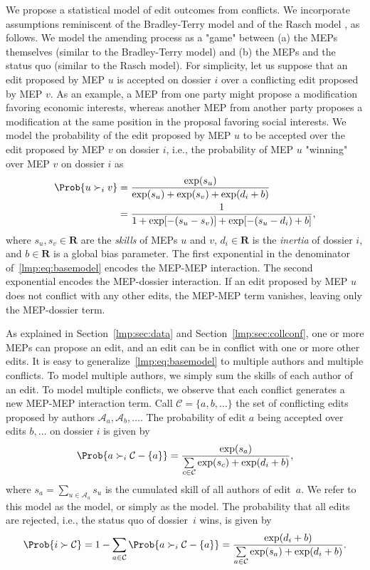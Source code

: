 We propose a statistical model of edit outcomes from conflicts.
We incorporate assumptions reminiscent of the Bradley-Terry model \cite{bradley1952rank} and of the Rasch model \cite{rasch1960probabilistic}, as follows.
We model the amending process as a "game" between (a) the MEPs themselves (similar to the Bradley-Terry model) and (b) the MEPs and the status quo (similar to the Rasch model).
For simplicity, let us suppose that an edit proposed by MEP $u$ is accepted on dossier $i$ over a conflicting edit proposed by MEP $v$.
As an example, a MEP from one party might propose a modification favoring economic interests, whereas another MEP from another party proposes a modification at the same position in the proposal favoring social interests.
We model the probability of the edit proposed by MEP $u$ to be accepted over the edit proposed by MEP $v$ on dossier $i$, i.e., the  probability of MEP $u$ "winning" over MEP $v$ on dossier $i$ as
\begin{align}
	\label{lmp:eq:basemodel}
  \Prob{ u \succ_i v }
	 & = \frac{\exp(s_u)}{\exp(s_u) + \exp(s_v) + \exp(d_i + b)} \nonumber  \\
	 & = \frac{1}{1 + \exp[ -( s_u - s_v ) ] + \exp[ -( s_u - d_i ) + b ]},
\end{align}
where $ s_u, s_v \in \mathbf{R} $ are the \textit{skills} of MEPs $u$ and $v$, $ d_i \in \mathbf{R} $ is the \textit{inertia} of dossier $i$, and $ b \in \mathbf{R} $ is a global bias parameter.
The first exponential in the denominator of~\eqref{lmp:eq:basemodel} encodes the MEP-MEP interaction.
The second exponential encodes the MEP-dossier interaction.
If an edit proposed by MEP $u$ does not conflict with any other edits, the MEP-MEP term vanishes, leaving only the MEP-dossier term.

As explained in Section~\ref{lmp:sec:data} and Section~\ref{lmp:sec:collconf}, one or more MEPs can propose an edit, and an edit can be in conflict with one or more other edits.
It is easy to generalize~\eqref{lmp:eq:basemodel} to multiple authors and multiple conflicts.
To model multiple authors, we simply sum the skills of each author of an edit.
To model multiple conflicts, we observe that each conflict generates a new MEP-MEP interaction term.
Call \mbox{$\mathcal{C} = \{ a, b, \dots \}$} the set of conflicting edits proposed by authors $ \mathcal{A}_a, \mathcal{A}_b, \dots $.
The probability of edit $a$ being accepted over edits $b, \dots$ on dossier $i$ is given by
\begin{equation}
	\label{lmp:eq:wowmodel}
	\Prob{ a \succ_i \mathcal{C} - \{ a\} } =
	\frac{\exp(s_a) }{ \sum\limits_{c \in \mathcal{C} } \exp(s_c) + \exp(d_i + b) },
\end{equation}
where $s_a = \sum_{u \in \mathcal{A}_a} s_u$ is the cumulated skill of all authors of edit~$a$.
We refer to this model as the \warofwords{} model, or simply as the \wow{} model.
The probability that all edits are rejected, i.e., the status quo of dossier~$i$ wins, is given by
\begin{equation*}
	\Prob{i \succ \mathcal{C} }
	= 1 - \sum_{a \in \mathcal{C} } \Prob{ a \succ_i \mathcal{C} - \{ a \}}
	= \frac{\exp(d_i + b) }{ \sum\limits_{a \in \mathcal{C} } \exp(s_a) + \exp(d_i + b) }.
\end{equation*}

